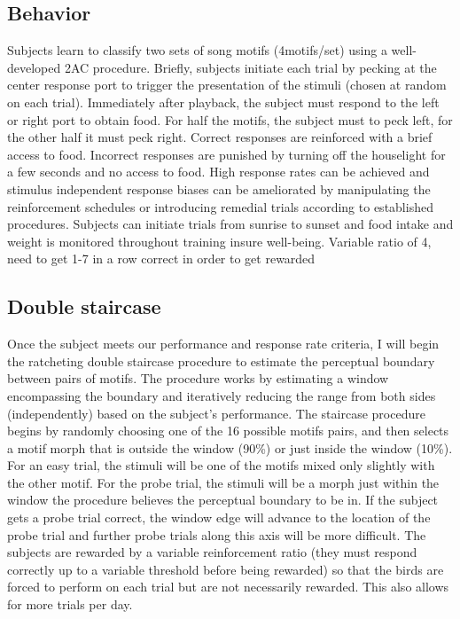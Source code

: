 \subsection{Behavior}
Subjects learn to classify two sets of song motifs (4motifs/set) using a well-developed \ac{2AC} procedure\cite{gentner2003neuronal}. Briefly, subjects initiate each trial by pecking at the center response port to trigger the presentation of the stimuli (chosen at random on each trial). Immediately after playback, the subject must respond to the left or right port to obtain food. For half the motifs, the subject must to peck left, for the other half it must peck right. Correct responses are reinforced with a brief access to food. Incorrect responses are punished by turning off the houselight for a few seconds and no access to food. High response rates can be achieved and stimulus independent response biases can be ameliorated by manipulating the reinforcement schedules or introducing remedial trials according to established procedures. Subjects can initiate trials from sunrise to sunset and food intake and weight is monitored throughout training insure well-being.
Variable ratio of 4, need to get 1-7 in a row correct in order to get rewarded

\subsection{Double staircase}
Once the subject meets our performance and response rate criteria, I will begin the ratcheting double staircase procedure to estimate the perceptual boundary between pairs of motifs. The procedure works by estimating a window encompassing the boundary and iteratively reducing the range from both sides (independently) based on the subject's performance. The staircase procedure begins by randomly choosing one of the 16 possible motifs pairs, and then selects a motif morph that is outside the window (90\%) or just inside the window (10\%). For an easy trial, the stimuli will be one of the motifs mixed only slightly with the other motif. For the probe trial, the stimuli will be a morph just within the window the procedure believes the perceptual boundary to be in. If the subject gets a probe trial correct, the window edge will advance to the location of the probe trial and further probe trials along this axis will be more difficult. The subjects are rewarded by a variable reinforcement ratio (they must respond correctly up to a variable threshold before being rewarded) so that the birds are forced to perform on each trial but are not necessarily rewarded. This also allows for more trials per day.

